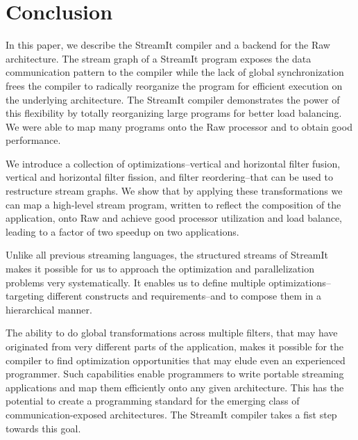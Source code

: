 \section{Conclusion}
\label{sec:conclusion}

In this paper, we describe the StreamIt compiler and a backend for the
Raw architecture.  The stream graph of a StreamIt program exposes the
data communication pattern to the compiler while the lack of global
synchronization frees the compiler to radically reorganize the program
for efficient execution on the underlying architecture. The StreamIt
compiler demonstrates the power of this flexibility by totally
reorganizing large programs for better load balancing.  We were able
to map many programs onto the Raw processor and to obtain good
performance.

We introduce a collection of optimizations--vertical and horizontal
filter fusion, vertical and horizontal filter fission, and filter
reordering--that can be used to restructure stream graphs.  We show
that by applying these transformations we can map a high-level stream
program, written to reflect the composition of the application, onto
Raw and achieve good processor utilization and load balance, leading
to a factor of two speedup on two applications.

Unlike all previous streaming languages, the structured streams of
StreamIt makes it possible for us to approach the optimization and
parallelization problems very systematically. It enables us to define
multiple optimizations--targeting different constructs and
requirements--and to compose them in a hierarchical manner.

The ability to do global transformations across multiple filters, that
may have originated from very different parts of the application,
makes it possible for the compiler to find optimization opportunities
that may elude even an experienced programmer.  Such capabilities
enable programmers to write portable streaming applications and map
them efficiently onto any given architecture. This has the potential
to create a programming standard for the emerging class of
communication-exposed architectures.  The StreamIt compiler takes a
fist step towards this goal.
